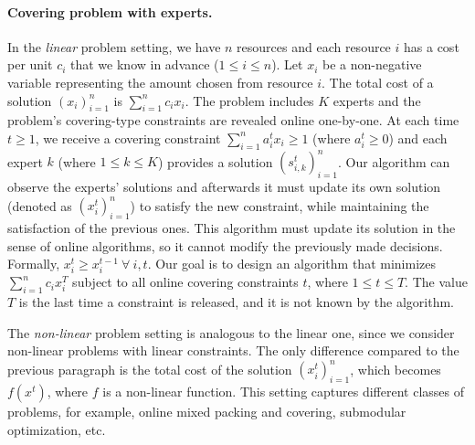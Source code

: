 \paragraph{Covering problem with experts.}
In the \emph{linear} problem setting, we have $n$ resources and each resource $i$ has a cost per unit $c_{i}$ that we know in advance ($1 \leq i \leq n$).
Let $x_{i}$ be a non-negative variable representing the amount chosen from resource $i$.
The total cost of a solution $(x_{i})_{i=1}^{n}$ is $\sum_{i=1}^{n} c_{i} x_{i}$.
The problem includes $K$ experts and the problem's covering-type constraints are revealed online one-by-one.
At each time $t \geq 1$, we receive a covering constraint $\sum_{i=1}^{n} a_{i}^{t} x_{i} \geq 1$ (where $a_{i}^{t} \geq 0$) and each expert $k$ (where $1 \leq k \leq K$) provides
a solution $(s_{i,k}^{t})_{i=1}^{n}$. Our algorithm can observe the experts' solutions and afterwards it must update its own solution (denoted as $(x_{i}^{t})_{i=1}^{n}$)
to satisfy the new constraint, while maintaining the satisfaction of the previous ones. This algorithm must update its solution in the sense of online algorithms, so it cannot modify the previously made decisions. Formally, $x_{i}^{t} \geq x_{i}^{t-1} ~\forall\ i, t$.
Our goal is to design an algorithm that minimizes $\sum_{i=1}^{n} c_{i} x_{i}^{T}$ subject to
all online covering constraints $t$, where $1 \leq t \leq T$. The value $T$ is the last time a constraint is released, and it is not known by the algorithm.

The \emph{non-linear} problem setting is analogous to the linear one, since we consider non-linear problems with linear constraints. The only difference compared to the previous paragraph is the total cost of the solution $(x_{i}^t)_{i=1}^{n}$, which becomes $f(x^t)$, where $f$ is a non-linear function. This setting captures different classes of problems, for example, online mixed packing and covering, submodular optimization, etc.  

